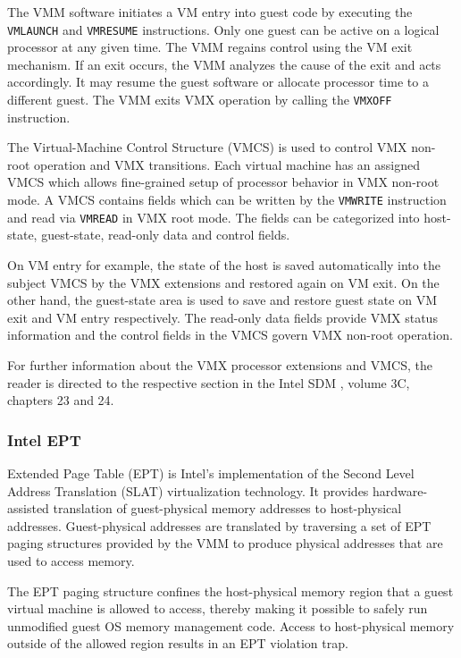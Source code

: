 The VMM software initiates a VM entry into guest code by executing the
\texttt{VMLAUNCH} and \texttt{VMRESUME} instructions. Only one guest can be
active on a logical processor at any given time. The VMM regains control using
the VM exit mechanism. If an exit occurs, the VMM analyzes the cause of the
exit and acts accordingly. It may resume the guest software or allocate
processor time to a different guest. The VMM exits VMX operation by calling the
\texttt{VMXOFF} instruction.

The Virtual-Machine Control Structure (VMCS) is used to control VMX
non-root operation and VMX transitions. Each virtual machine has an assigned
VMCS which allows fine-grained setup of processor behavior in VMX non-root
mode. A VMCS contains fields which can be written by the
\texttt{VMWRITE} instruction and read via
\texttt{VMREAD} in VMX root mode. The fields can be categorized
into host-state, guest-state, read-only data and control fields.

On VM entry for example, the state of the host is saved automatically into the
subject VMCS by the VMX extensions and restored again on VM exit. On the other
hand, the guest-state area is used to save and restore guest state on VM exit
and VM entry respectively. The read-only data fields provide VMX status
information and the control fields in the VMCS govern VMX non-root operation.

For further information about the VMX processor extensions and VMCS, the reader
is directed to the respective section in the Intel SDM \cite{IntelSDM}, volume
3C, chapters 23 and 24.

\subsubsection{Intel EPT}\label{subsubsec:ept}
Extended Page Table (EPT) is Intel's implementation of the Second
Level Address Translation (SLAT) virtualization technology. It
provides hardware-assisted translation of guest-physical memory addresses to
host-physical addresses. Guest-physical addresses are translated by traversing a
set of EPT paging structures provided by the VMM to produce physical addresses
that are used to access memory.

The EPT paging structure confines the host-physical memory region that a guest
virtual machine is allowed to access, thereby making it possible to safely run
unmodified guest OS memory management code. Access to host-physical memory
outside of the allowed region results in an EPT violation trap.

